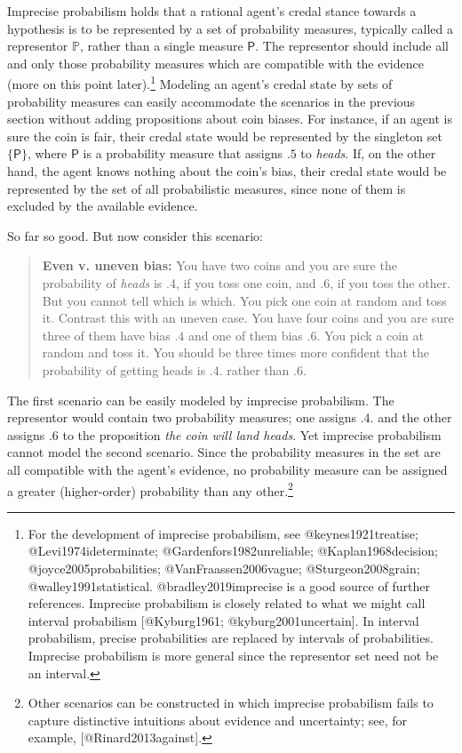 \documentclass[
  letterpaper,
  DIV=11,
  numbers=noendperiod]{scrartcl}
\begin{document}
Imprecise probabilism holds that a rational agent's credal stance
towards a hypothesis is to be represented by a set of probability
measures, typically called a representor \(\mathbb{P}\), rather than a
single measure \(\mathsf{P}\). The representor should include all and
only those probability measures which are compatible with the evidence
(more on this point later).\footnote{For the development of imprecise
  probabilism, see @keynes1921treatise; @Levi1974ideterminate;
  @Gardenfors1982unreliable; @Kaplan1968decision;
  @joyce2005probabilities; @VanFraassen2006vague; @Sturgeon2008grain;
  @walley1991statistical. @bradley2019imprecise is a good source of
  further references. Imprecise probabilism is closely related to what
  we might call interval probabilism {[}@Kyburg1961;
  @kyburg2001uncertain{]}. In interval probabilism, precise
  probabilities are replaced by intervals of probabilities. Imprecise
  probabilism is more general since the representor set need not be an
  interval.} Modeling an agent's credal state by sets of probability
measures can easily accommodate the scenarios in the previous section
without adding propositions about coin biases. For instance, if an agent
is sure the coin is fair, their credal state would be represented by the
singleton set \(\{\mathsf{P}\}\), where \(\mathsf{P}\) is a probability
measure that assigns \(.5\) to \emph{heads}. If, on the other hand, the
agent knows nothing about the coin's bias, their credal state would be
represented by the set of all probabilistic measures, since none of them
is excluded by the available evidence.

So far so good. But now consider this scenario:

\begin{quote}
\textbf{Even v. uneven bias:}
 You have two coins and you are sure the probability of \emph{heads} is .4, if you toss one coin, and .6, if you toss the other. But you cannot tell which is which. You pick one coin at random and toss it.  Contrast this with an uneven case. You have four coins and you are sure three of them have bias $.4$ and one of them bias $.6$. You pick a coin at random and toss it. You should be three times more confident that the probability of getting heads is .4. rather than .6.
\end{quote}

\noindent The first scenario can be easily modeled by imprecise
probabilism. The representor would contain two probability measures; one
assigns .4. and the other assigns .6 to the proposition
\emph{the coin will land heads}. Yet imprecise probabilism cannot model
the second scenario. Since the probability measures in the set are all
compatible with the agent's evidence, no probability measure can be
assigned a greater (higher-order) probability than any other.\footnote{Other
  scenarios can be constructed in which imprecise probabilism fails to
  capture distinctive intuitions about evidence and uncertainty; see,
  for example, {[}@Rinard2013against{]}.}
\end{document}
